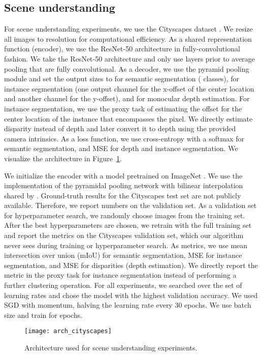 \documentclass{article}
\begin{document}
\subsection{Scene understanding}
For scene understanding experiments, we use the Cityscapes dataset \citep{cityscapes}. We resize all images to resolution  for computational efficiency. As a shared representation function (encoder), we use the ResNet-50 architecture \citep{resnet} in fully-convolutional fashion. We take the ResNet-50 architecture and only use layers prior to average pooling that are fully convolutional. As a decoder, we use the pyramid pooling module \citep{pspnet} and set the output sizes to  for semantic segmentation ( classes),  for instance segmentation (one output channel for the x-offset of the center location and another channel for the y-offset), and  for monocular depth estimation. For instance segmentation, we use the proxy task of estimating the offset for the center location of the instance that encompasses the pixel. We directly estimate disparity instead of depth and later convert it to depth using the provided camera intrinsics. As a loss function, we use cross-entropy with a softmax for semantic segmentation, and MSE for depth and instance segmentation. We visualize the architecture in Figure~\ref{fig:scene}.

We initialize the encoder with a model pretrained on ImageNet \citep{imagenet}. We use the implementation of the pyramidal pooling network with bilinear interpolation shared by \citet{pspnet_implementation}. Ground-truth results for the Cityscapes test set are not publicly available. Therefore, we report numbers on the validation set. As a validation set for hyperparameter search, we randomly choose  images from the training set. After the best hyperparameters are chosen, we retrain with the full training set and report the metrics on the Cityscapes validation set, which our algorithm never sees during training or hyperparameter search. As metrics, we use mean intersection over union (mIoU) for semantic segmentation, MSE for instance segmentation, and MSE for disparities (depth estimation). We directly report the metric in the proxy task for instance segmentation instead of performing a further clustering operation. For all experiments, we searched over the set  of learning rates and chose the model with the highest validation accuracy. We used SGD with momentum, halving the learning rate every 30 epochs. We use batch size  and train for  epochs.

\begin{figure}[ht]
\texttt{[image: arch\_cityscapes]}
\caption{Architecture used for scene understanding experiments.}
\label{fig:scene}
\end{figure}
 
\end{document}
